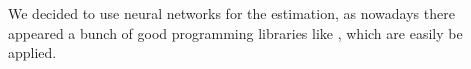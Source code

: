 \documentclass[conference]{IEEEtran}
\begin{document}
We decided to use neural networks for the estimation, as nowadays there appeared a bunch of good programming libraries like \cite{nnlibex}, which are easily  be applied.


\end{document}
